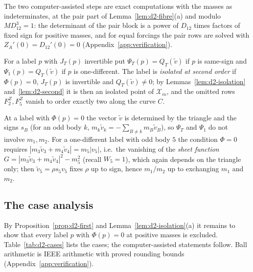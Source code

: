The two computer-assisted steps are exact computations with the masses as indeterminates, at
the pair part of Lemma~\ref{lem:d2-fibre}(a) and modulo $MD_{12}^3=1$: the determinant of the pair
block is a power of $D_{12}$ times factors of fixed sign for positive masses, and for equal
forcings the pair rows are solved with $Z_A'(0)=D_{12}'(0)=0$ (Appendix~\ref{app:verification}).

\begin{definition}\label{def:d2-psi}
For a label $p$ with $J_T(p)$ invertible put $\Psi_T(p)=Q_T(\tilde v)$ if $p$ is same-sign and
$\Psi_1(p)=Q_T(\tilde v)$ if $p$ is one-different.  The label is \emph{isolated at second order}
if $\Phi(p)=0$, $J_T(p)$ is invertible and $Q_T(\tilde v)\ne0$; by
Lemmas~\ref{lem:d2-isolation} and~\ref{lem:d2-second} it is then an isolated point of $\mathcal X_m$, and
the omitted rows $F^Z_2,F^Z_5$ vanish to order exactly two along the curve $C$.
\end{definition}

At a label with $\Phi(p)=0$ the vector $\tilde v$ is determined by the triangle and the signs
$s_B$ (for an odd body $k$, $m_k\tilde v_k=-\sum_{B\ne k}m_B\tilde v_B$), so $\Psi_T$ and
$\Psi_1$ do not involve $m_1,m_2$.  For a one-different label with odd body $5$ the condition
$\Phi=0$ requires $|m_3\tilde v_3+m_4\tilde v_4|=m_5|v_5|$, i.e.\ the vanishing of the
\emph{sheet function} $G=|m_3\tilde v_3+m_4\tilde v_4|^2-m_5^2$ (recall $W_5=1$), which again
depends on the triangle only; then $\tilde v_5=\rho s_5v_5$ fixes $\rho$ up to sign, hence
$m_1/m_2$ up to exchanging $m_1$ and $m_2$.

\subsection{The case analysis}\label{sec:d2-cases}

By Proposition~\ref{prop:d2-first} and Lemma~\ref{lem:d2-isolation}(a) it remains to show that
every label $p$ with $\Phi(p)=0$ at positive masses is excluded.  Table~\ref{tab:d2-cases} lists
the cases; the computer-assisted statements follow.  Ball arithmetic is IEEE arithmetic with
proved rounding bounds (Appendix~\ref{app:verification}).

